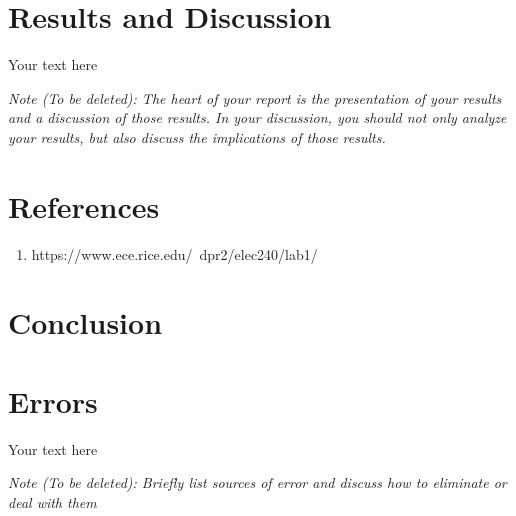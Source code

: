 \documentclass[10pt]{article}
\begin{document}
	
		
	\medskip
	
	
	\section{Results and Discussion}
	
	Your text here
	
	\medskip
	
	\textit{Note (To be deleted): The heart of your report is the presentation of your results and a discussion of those results. In your discussion, you should not only analyze your results, but also discuss the implications of those results.}
	
	\section{References}
	
	\begin{enumerate}
		\item https://www.ece.rice.edu/~dpr2/elec240/lab1/
	\end{enumerate}
	
	\medskip
	
	
	
	\section{Conclusion}
	
	
	
	\medskip
	
	
	\section{Errors}
	
	Your text here
	
	\medskip
	
	\textit{Note (To be deleted): Briefly list sources of error and discuss how to eliminate or deal with them}
	
\end{document}
